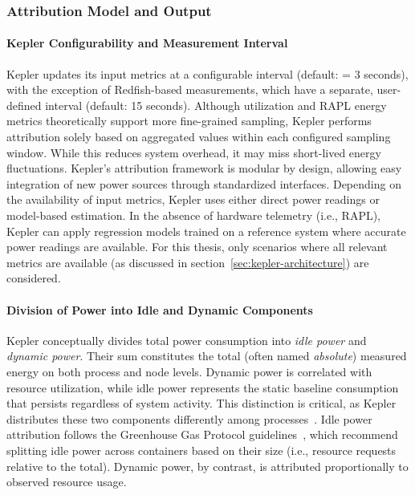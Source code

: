\subsubsection{Attribution Model and Output}
\label{sec:kepler-attribution}

\paragraph{Kepler Configurability and Measurement Interval}
Kepler updates its input metrics at a configurable interval (default:  = 3 seconds), with the exception of Redfish-based measurements, which have a separate, user-defined interval (default: 15 seconds). Although utilization and RAPL energy metrics theoretically support more fine-grained sampling, Kepler performs attribution solely based on aggregated values within each configured sampling window. While this reduces system overhead, it may miss short-lived energy fluctuations. Kepler's attribution framework is modular by design, allowing easy integration of new power sources through standardized interfaces. Depending on the availability of input metrics, Kepler uses either direct power readings or model-based estimation. In the absence of hardware telemetry (i.e., RAPL), Kepler can apply regression models trained on a reference system where accurate power readings are available. For this thesis, only scenarios where all relevant metrics are available (as discussed in section~\ref{sec:kepler-architecture}) are considered.

\paragraph{Division of Power into Idle and Dynamic Components}
Kepler conceptually divides total power consumption into \emph{idle power} and \emph{dynamic power}. Their sum constitutes the total (often named \emph{absolute}) measured energy on both process and node levels. Dynamic power is correlated with resource utilization, while idle power represents the static baseline consumption that persists regardless of system activity. This distinction is critical, as Kepler distributes these two components differently among processes~\parencite{amaral2023exploring}. Idle power attribution follows the Greenhouse Gas Protocol guidelines~\parencite{gesi2024ictguidance}, which recommend splitting idle power across containers based on their size (i.e., resource requests relative to the total). Dynamic power, by contrast, is attributed proportionally to observed resource usage.

